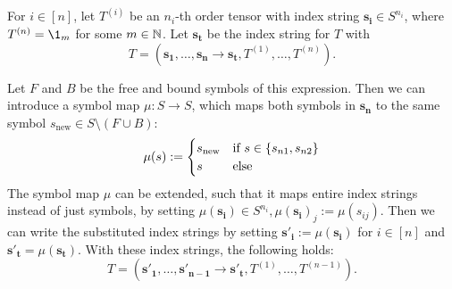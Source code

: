 \begin{lemma}
    \label{lemma:nested_einsum:3}
    For $i \in [n]$, let $T^{(i)}$ be an $n_i$-th order tensor with index string $\bm{s_i} \in S^{n_i}$,
    where $T^{(n)} = \1_m$ for some $m \in \mathbb{N}$.
    Let $\bm{s_t}$ be the index string for $T$ with
    $$T = (\bm{s_1}, \dots, \bm{s_n} \rightarrow \bm{s_t}, T^{(1)}, \dots, T^{(n)}).$$

    Let $F$ and $B$ be the free and bound symbols of this expression.
    Then we can introduce a symbol map $\mu: S \rightarrow S$, which maps both symbols in $\bm{s_n}$ to the same symbol $s_{\text{new}} \in S \setminus (F \cup B)$:
    $$\mu(s) := \begin{cases}
            s_{\text{new}} & \text{if $s \in \lbrace s_{n1}, s_{n2} \rbrace$} \\
            s              & \text{else}
        \end{cases}$$
    The symbol map $\mu$ can be extended, such that it maps entire index strings instead of just symbols, by setting $\mu(\bm{s_i}) \in S^{n_i}, \mu(\bm{s_i})_j := \mu(s_{ij})$.
    Then we can write the substituted index strings by setting $\bm{s'_i} := \mu(\bm{s_i})$ for $i \in [n]$ and $\bm{s'_t} = \mu(\bm{s_t})$.
    With these index strings, the following holds:
    $$T = (\bm{s'_1}, \dots, \bm{s'_{n - 1}} \rightarrow \bm{s'_t}, T^{(1)}, \dots, T^{(n - 1)}).$$
\end{lemma}

